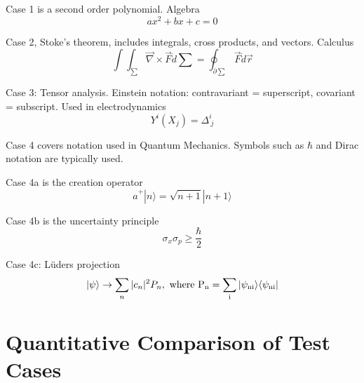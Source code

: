 \documentclass{article}
\begin{document}
\begin{multicols}{2}

Case 1 is a second order polynomial. Algebra
\begin{equation}
a x^2 + b x + c = 0
\label{eq:polynomial_case1_body}
\end{equation}

Case 2, Stoke's theorem, includes integrals, cross products, and vectors. Calculus
\begin{equation}
\int \int_{\sum} \vec{\nabla} \times \vec{F} \dot d\sum = \oint_{\partial \sum} \vec{F}\dot d\vec{r}
\label{eq:stokes_case2_body}
\end{equation}

Case 3: Tensor analysis. Einstein notation: contravariant = superscript, covariant = subscript. Used in electrodynamics
\begin{equation}
Y^i(X_j) = \Delta^i_{\ j}
\label{eq:tensor_analysis_case3_body}
\end{equation}

Case 4 covers notation used in Quantum Mechanics. Symbols such as $\hbar$ and Dirac notation are typically used.

Case 4a is the creation operator 
\begin{equation}
\hat{a}^+ |n\rangle = \sqrt{n+1} |n+1\rangle
\label{eq:creation_operator_case4a_body}
\end{equation}

Case 4b is the uncertainty principle
\begin{equation}
\sigma_x \sigma_p \geq \frac{\hbar}{2}
\label{eq:uncertainty_principle_case4b_body}
\end{equation}

Case 4c: L\"{u}ders projection
\begin{equation}
 |\psi\rangle \rightarrow \sum_n  |c_n|^2 P_n,\ \rm{where}\ P_n = \sum_i |\psi_{ni}\rangle \langle \psi_{ni}|
\label{eq:Luders_projection_case4c_body}
\end{equation}

\section{Quantitative Comparison of Test Cases\label{sec:quant_compare}}

\end{multicols}
\end{document}
